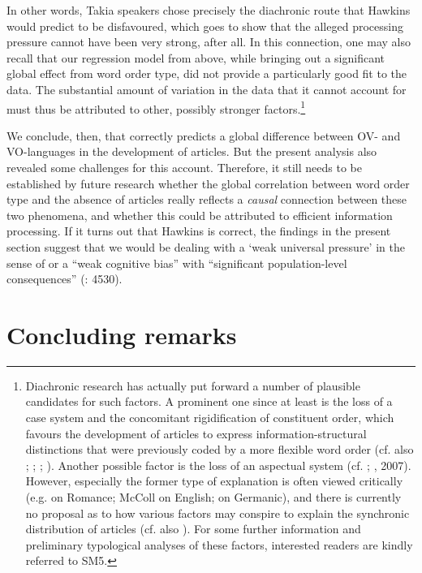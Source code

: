 \documentclass[output=paper]{langsci/langscibook}
\begin{document}
In other words, Takia speakers chose precisely the diachronic route that Hawkins would predict to be disfavoured, which goes to show that the alleged processing pressure cannot have been very strong, after all. In this connection, one may also recall that our regression model from above, while bringing out a significant global effect from word order type, did not provide a particularly good fit to the data. The substantial amount of variation in the data that it cannot account for must thus be attributed to other, possibly stronger factors.\footnote{Diachronic research has actually put forward a number of plausible candidates for such factors. A prominent one since at least \citet{Vennemann1975} is the loss of a case system and the concomitant rigidification of constituent order, which favours the development of articles to express information-structural distinctions that were previously coded by a more flexible word order (cf. also \citealt{Hawkins2004}; \citealt{HewsonBubenik2006}; \citealt{Fischer2010}; \citealt{CarlierLamiroy2014}). Another possible factor is the loss of an aspectual system (cf. \citealt{Abraham1997}; \citealt{Leiss2000}, 2007). However, especially the former type of explanation is often viewed critically (e.g. \citealt{Selig1992} on Romance; McColl \citealt{Millar2000} on English; \citealt{Leiss2000} on Germanic), and there is currently no proposal as to how various factors may conspire to explain the synchronic distribution of articles (cf. also \citealt{Lüdtke1991}). For some further information and preliminary typological analyses of these factors, interested readers are kindly referred to SM5.}

We conclude, then, that \citet{Hawkins2014} correctly predicts a global difference between OV- and VO-languages in the development of articles. But the present analysis also revealed some challenges for this account. Therefore, it still needs to be established by future research whether the global correlation between word order type and the absence of articles really reflects a \textit{causal} connection between these two phenomena, and whether this could be attributed to efficient information processing. If it turns out that Hawkins is correct, the findings in the present section suggest that we would be dealing with a ‘weak universal pressure’ in the sense of \citet{Seržant2019 (this volume)} or a “weak cognitive bias” with “significant population-level consequences” (\citealt{ThompsonEtAl2016}: 4530).

\section{ Concluding remarks} 
\end{document}
